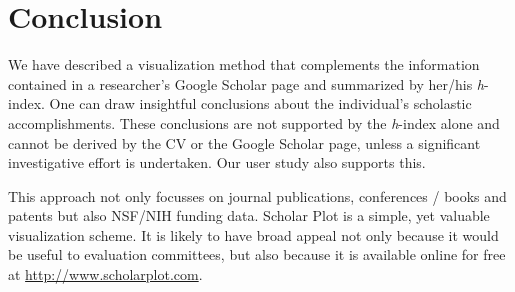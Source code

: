 \chapter{Conclusion}\label{chap:Conclusion}

We have described a visualization method that complements the information contained in a researcher's Google Scholar page and summarized by her/his {\it h}-index. One can draw insightful conclusions about the individual's scholastic accomplishments. These conclusions are not supported by the {\it h}-index alone and cannot be derived by the CV or the Google Scholar page, unless a significant investigative effort is undertaken. Our user study also supports this.

This approach not only focusses on journal publications, conferences / books and patents but also NSF/NIH funding data. Scholar Plot is a simple, yet valuable visualization scheme. It is likely to have broad appeal not only because it would be useful to evaluation committees, but also because it is available online for free at \url{http://www.scholarplot.com}. 

